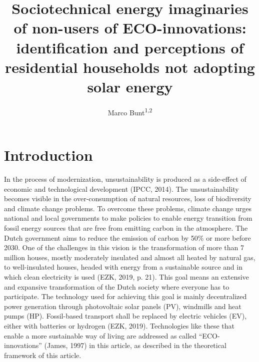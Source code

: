\documentclass[man,floatsintext]{apa6}
\title{Sociotechnical energy imaginaries of non-users of ECO-innovations:
identification and perceptions of residential households not adopting
solar energy}
\author{Marco Bunt\textsuperscript{1,2}}
\date{}
\affiliation{
\vspace{0.5cm}
\textsuperscript{1} Erasmus school of social and behavioural sciences\\\textsuperscript{2} Stedin netbeheer}
\begin{document}
\maketitle

\section{Introduction}\label{introduction}

In the process of modernization, unsustainability is produced as a
side-effect of economic and technological development (IPCC, 2014). The
unsustainability becomes visible in the over-consumption of natural
resources, loss of biodiversity and climate change problems. To overcome
these problems, climate change urges national and local governments to
make policies to enable energy transition from fossil energy sources
that are free from emitting carbon in the atmosphere. The Dutch
government aims to reduce the emission of carbon by 50\% or more before
2030. One of the challenges in this vision is the transformation of more
than 7 million houses, mostly moderately insulated and almost all heated
by natural gas, to well-insulated houses, headed with energy from a
sustainable source and in which clean electricity is used (EZK, 2019, p.
21). This goal means an extensive and expansive transformation of the
Dutch society where everyone has to participate. The technology used for
achieving this goal is mainly decentralized power generation through
photovoltaic solar panels (PV), windmills and heat pumps (HP).
Fossil-based transport shall be replaced by electric vehicles (EV),
either with batteries or hydrogen (EZK, 2019). Technologies like these
that enable a more sustainable way of living are addressed as called
\enquote{ECO-innovations} (James, 1997) in this article, as described in
the theoretical framework of this article.
\end{document}
